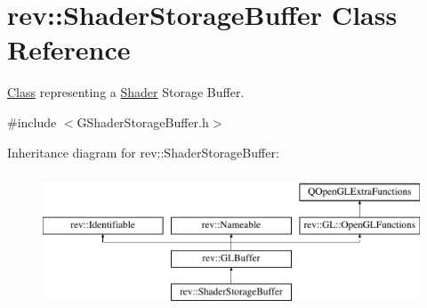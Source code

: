\hypertarget{classrev_1_1_shader_storage_buffer}{}\section{rev\+::Shader\+Storage\+Buffer Class Reference}
\label{classrev_1_1_shader_storage_buffer}


\mbox{\hyperlink{struct_class}{Class}} representing a \mbox{\hyperlink{classrev_1_1_shader}{Shader}} Storage Buffer.  




{\ttfamily \#include $<$G\+Shader\+Storage\+Buffer.\+h$>$}

Inheritance diagram for rev\+::Shader\+Storage\+Buffer\+:\begin{figure}[H]
\begin{center}
\leavevmode
\includegraphics[height=4.000000cm]{classrev_1_1_shader_storage_buffer}
\end{center}
\end{figure}
